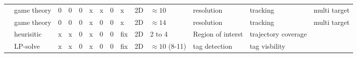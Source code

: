 \begin{landscape}
\begin{table}[]
\begin{tabular}{@{}l|p{2.4cm}  l  l l p{0.659cm}p{0.62cm}lp{1.3cm}p{1.57cm}p{1.5cm}p{1.6cm}p{1.3cm}p{1.2cm}@{}}
\rowcolor[HTML]{EFEFEF} 
\cite{18*ding2012}                                & game theory                                                                            & 0                                   & 0                                   & 0                                  & x                        & x                         & 0                         & x                                 & 2D                                                                                      & $\approx 10                                                                        $ & resolution                                                                     & tracking             & multi target                        \\
\rowcolor[HTML]{FFFFFF} 
\cite{25*song2008}                                & game theory                                                                            & 0                                   & 0                                   & 0                                  & x                        & 0                         & 0                         & x                                 & 2D                                                                                      & $\approx 14                                                                        $ & resolution                                                                     & tracking             & multi target                      \\
\rowcolor[HTML]{EFEFEF} 
 \cite{81*nikolaidis2009}                      & heurisitic                                                                             & x                                   & x                                   & 0                                  & x                        & 0                         & 0                         & fix                               & 2D                                                                                      & 2 to 4                                                                            & Region of interst                                                              & trajectory \newline coverage  &                                  \\
\rowcolor[HTML]{FFFFFF} 
\cite{22*zhao2008}                    & LP-solve                                                                               & x                                   & x                                   & 0                                  & x        & 0                         & 0                         & fix                               & 2D                                                                                      & $\approx 10                                                                        $ (8-11)                                                                  & tag \newline detection                                                                  & tag \newline visbility        &                                  \\

\end{tabular}
\end{table}
\end{landscape}
